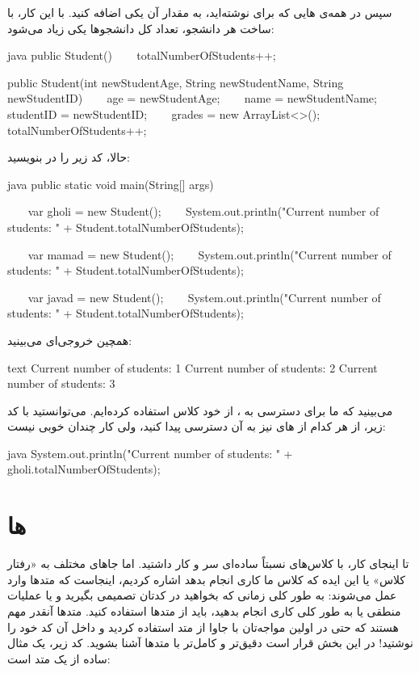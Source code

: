 سپس در همه‌ی  هایی که برای 
نوشته‌اید، به مقدار آن یکی اضافه کنید. با این کار، با ساخت هر دانشجو،
تعداد کل دانشجوها یکی زیاد می‌شود:

\begin{codebox}{java}
public Student() {
    totalNumberOfStudents++;  
}

public Student(int newStudentAge, String newStudentName, String newStudentID) {
    age = newStudentAge;
    name = newStudentName;
    studentID = newStudentID;
    grades = new ArrayList<>();
    
    totalNumberOfStudents++;  
}
\end{codebox}

حالا، کد زیر را در  بنویسید:

\begin{codebox}{java}
public static void main(String[] args) {
    var gholi = new Student();  
    System.out.println("Current number of students: " + Student.totalNumberOfStudents);

    var mamad = new Student();  
    System.out.println("Current number of students: " + Student.totalNumberOfStudents);

    var javad = new Student();  
    System.out.println("Current number of students: " + Student.totalNumberOfStudents);  
}
\end{codebox}

همچین خروجی‌ای می‌بینید:

\begin{codebox}{text}
Current number of students: 1  
Current number of students: 2  
Current number of students: 3
\end{codebox}

می‌بینید که ما برای دسترسی به  ، از
خود کلاس  استفاده کرده‌ایم. می‌توانستید با کد زیر، از
هر کدام از  های  نیز به آن دسترسی پیدا
کنید، ولی کار چندان خوبی نیست:

\begin{codebox}{java}
System.out.println("Current number of students: " + gholi.totalNumberOfStudents);
\end{codebox}

\section{ ها}

تا اینجای کار، با کلاس‌های نسبتاً ساده‌ای سر و کار داشتید. اما جاهای مختلف
به «رفتار کلاس» یا این ایده که کلاس ما کاری انجام بدهد اشاره کردیم،
اینجاست که متدها وارد عمل می‌شوند: به طور کلی زمانی که بخواهید در کدتان
تصمیمی بگیرید و یا عملیات منطقی یا به طور کلی کاری انجام بدهید، باید از
متدها استفاده کنید. متدها آنقدر مهم هستند که حتی در اولین مواجه‌\-تان با
جاوا از متد  استفاده کردید و داخل آن کد خود را نوشتید!
در این بخش قرار است دقیق‌\-تر و کامل‌\-تر با متدها آشنا بشوید. کد زیر، یک
مثال ساده از یک متد است:

